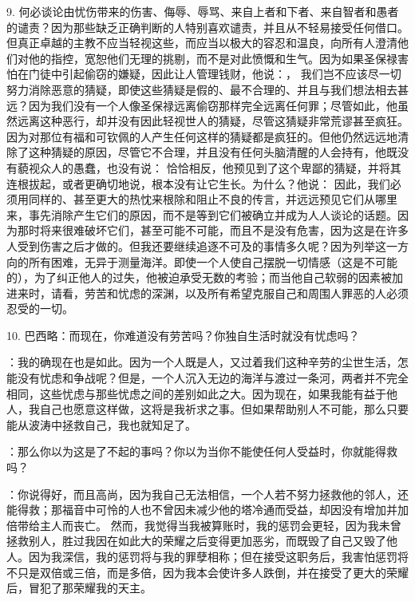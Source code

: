 9. 何必谈论由忧伤带来的伤害、侮辱、辱骂、来自上者和下者、来自智者和愚者的谴责？因为那些缺乏正确判断的人特别喜欢谴责，并且从不轻易接受任何借口。但真正卓越的主教不应当轻视这些，而应当以极大的容忍和温良，向所有人澄清他们对他的指控，宽恕他们无理的挑剔，而不是对此愤慨和生气。因为如果圣保禄害怕在门徒中引起偷窃的嫌疑，因此让人管理钱财，他说：， 我们岂不应该尽一切努力消除恶意的猜疑，即使这些猜疑是假的、最不合理的、并且与我们想法相去甚远？因为我们没有一个人像圣保禄远离偷窃那样完全远离任何罪；尽管如此，他虽然远离这种恶行，却并没有因此轻视世人的猜疑，尽管这猜疑非常荒谬甚至疯狂。因为对那位有福和可钦佩的人产生任何这样的猜疑都是疯狂的。但他仍然远远地清除了这种猜疑的原因，尽管它不合理，并且没有任何头脑清醒的人会持有，他既没有藐视众人的愚蠢，也没有说： 恰恰相反，他预见到了这个卑鄙的猜疑，并将其连根拔起，或者更确切地说，根本没有让它生长。为什么？他说： 因此，我们必须用同样的、甚至更大的热忱来根除和阻止不良的传言，并远远预见它们从哪里来，事先消除产生它们的原因，而不是等到它们被确立并成为人人谈论的话题。因为那时将来很难破坏它们，甚至可能不可能，而且不是没有危害，因为这是在许多人受到伤害之后才做的。但我还要继续追逐不可及的事情多久呢？因为列举这一方向的所有困难，无异于测量海洋。即使一个人使自己摆脱一切情感（这是不可能的），为了纠正他人的过失，他被迫承受无数的考验；而当他自己软弱的因素被加进来时，请看，劳苦和忧虑的深渊，以及所有希望克服自己和周围人罪恶的人必须忍受的一切。\par

10. 巴西略：而现在，你难道没有劳苦吗？你独自生活时就没有忧虑吗？\par

：我的确现在也是如此。因为一个人既是人，又过着我们这种辛劳的尘世生活，怎能没有忧虑和争战呢？但是，一个人沉入无边的海洋与渡过一条河，两者并不完全相同，这些忧虑与那些忧虑之间的差别如此之大。因为现在，如果我能有益于他人，我自己也愿意这样做，这将是我祈求之事。但如果帮助别人不可能，那么只要能从波涛中拯救自己，我也就知足了。\par

：那么你以为这是了不起的事吗？你以为当你不能使任何人受益时，你就能得救吗？\par

：你说得好，而且高尚，因为我自己无法相信，一个人若不努力拯救他的邻人，还能得救；那福音中可怜的人也不曾因未减少他的塔冷通而受益，却因没有增加并加倍带给主人而丧亡。 然而，我觉得当我被算账时，我的惩罚会更轻，因为我未曾拯救别人，胜过我因在如此大的荣耀之后变得更加恶劣，而既毁了自己又毁了他人。因为我深信，我的惩罚将与我的罪孽相称；但在接受这职务后，我害怕惩罚将不只是双倍或三倍，而是多倍，因为我本会使许多人跌倒，并在接受了更大的荣耀后，冒犯了那荣耀我的天主。\par


